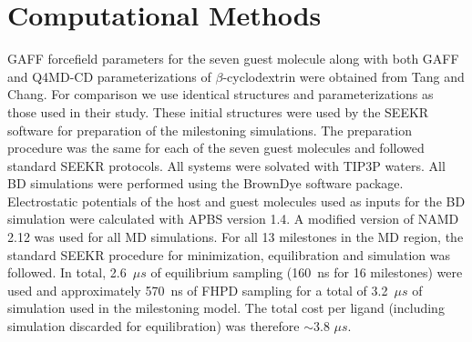 
\section*{Computational Methods}

\par GAFF\cite{Wang2004,Wang2006} forcefield parameters for the seven guest molecule
along with both GAFF and Q4MD-CD\cite{Cezard2011} parameterizations of $\beta$-cyclodextrin 
were obtained from Tang and Chang\cite{Tang2017}. For comparison we use identical structures and
parameterizations as those used in their study. These initial structures were 
used by the SEEKR software for preparation of the milestoning simulations. 
The preparation procedure was the same for each of the seven guest molecules and 
followed standard SEEKR protocols\cite{Votapka2017}. All systems were solvated 
with TIP3P waters\cite{Jorgensen1983a}. All BD simulations were performed using the BrownDye software package\cite{Huber2010}. 
Electrostatic potentials of the host and guest molecules used as inputs for the 
BD simulation were calculated with APBS version 1.4\cite{Baker2001}. 
A modified version of NAMD 2.12 was used for all MD simulations\cite{Phillips2005}.
For all 13 milestones in the MD region, the standard SEEKR procedure for 
minimization, equilibration and simulation was followed. In total, 2.6~${\mu}s$ of equilibrium sampling (160~ns for 16 milestones) were 
used and approximately 570~ns of FHPD sampling for a total of 3.2~${\mu}s$ of 
simulation used in the milestoning model. The total cost per ligand (including 
simulation discarded for equilibration) was therefore $\sim$3.8 ${\mu}s$. 